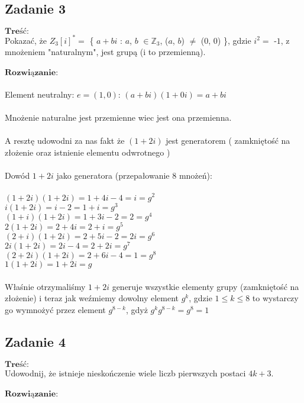 \subsection{Zadanie 3}
$\textbf{Treść:}$ \\ \newline
Pokazać, że $Z_{3}[i]^{*}
 =$ \{ $a + bi$ : $a$, $b$ $\in \mathbb{Z}_{3}$, ($a$, $b$) $\neq$ ($0$, $0$) \}, gdzie $i^{2} = $ -$1$, z
mnożeniem "naturalnym", jest grupą (i to przemienną).
\\
\\
$\textbf{Rozwiązanie:}$ \\
\\
Element neutralny: $e = (1,0)$: $(a + bi)(1 + 0i) = a + bi$
\\ \\
Mnożenie naturalne jest przemienne wiec jest ona przemienna.
\\ \\
A resztę udowodni za nas fakt że $(1 + 2i)$ jest generatorem ( zamkniętość na złożenie oraz istnienie elementu odwrotnego )
\\ \\
Dowód $1 + 2i$ jako generatora (przepałowanie 8 mnożeń):
\\ \\
$(1 + 2i)(1 + 2i) = 1 + 4i -4 = i = g^{2}$\\
$i(1 + 2i) = i - 2 = 1 + i = g^{3}$\\
$(1 + i)(1 + 2i) = 1 + 3i - 2 = 2 = g^{4}$\\
$2(1+2i) = 2 + 4i = 2 + i = g^{5}$\\
$(2 + i)(1 + 2i) = 2 + 5i -2 = 2i = g^{6}$\\
$2i(1 + 2i) = 2i - 4 = 2 + 2i = g^{7}$\\
$(2 + 2i)(1 + 2i) = 2 + 6i - 4 = 1 = g^{8}$\\
$1(1 + 2i) = 1 + 2i = {g}$\\
\\
Właśnie otrzymaliśmy $1 + 2i$ generuje wszystkie elementy grupy (zamkniętość na złożenie) i teraz jak weźmiemy dowolny element $g^{k}$, gdzie $1 \leq k \leq 8$ to wystarczy go wymnożyć przez element  $g^{8-k}$, gdyż $g^{k}g^{8-k} = g^8 = 1$

\subsection{Zadanie 4}
$\textbf{Treść:}$ \\ \newline
Udowodnij, że istnieje nieskończenie wiele liczb pierwszych postaci $4k + 3$.
\\
\\
$\textbf{Rozwiązanie:}$ \\

